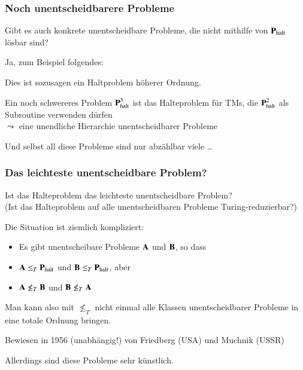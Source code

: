 \documentclass[aspectratio=1610,onlymath]{beamer}
\begin{document}
\begin{frame}\frametitle{Noch unentscheidbarere Probleme}

Gibt es auch konkrete unentscheidbare Probleme, die nicht
mithilfe von $\textbf{\textcolor{black}{P}}_{\text{halt}}$ lösbar sind?
\bigskip\pause

Ja, zum Beispiel folgendes:


Dies ist sozusagen ein Haltproblem höherer Ordnung.\bigskip\pause

Ein noch schwereres Problem $\textbf{\textcolor{black}{P}}^3_{\text{halt}}$ ist
das Halteproblem für TMs, die $\textbf{\textcolor{black}{P}}^2_{\text{halt}}$ als Subroutine
verwenden dürfen\\
$\leadsto$ \alert{eine unendliche Hierarchie unentscheidbarer Probleme}
\bigskip\pause

Und selbst all diese Probleme sind nur abzählbar viele \ldots

\end{frame}

\begin{frame}\frametitle{Das leichteste unentscheidbare Problem?}

\begin{center}
\alert{Ist das Halteproblem das leichteste unentscheidbare Problem?}\\
{\tiny (Ist das Halteproblem auf alle unentscheidbaren Probleme Turing-reduzierbar?)}
\end{center}

\bigskip
\pause {}
\bigskip

Die Situation ist ziemlich kompliziert:
\begin{itemize}
\item Es gibt unentscheibare Probleme $\textbf{\textcolor{black}{A}}$ und $\textbf{\textcolor{black}{B}}$, so dass
\item $\textbf{\textcolor{black}{A}}\leq_T \textbf{\textcolor{black}{P}}_{\text{halt}}$ und $\textbf{\textcolor{black}{B}}\leq_T \textbf{\textcolor{black}{P}}_{\text{halt}}$, aber
\item $\textbf{\textcolor{black}{A}}\not\leq_T \textbf{\textcolor{black}{B}}$ und $\textbf{\textcolor{black}{B}}\not\leq_T \textbf{\textcolor{black}{A}}$
\end{itemize}

Man kann also mit $\not\leq_T$ nicht einmal alle Klassen unentscheidbarer Probleme
in eine totale Ordnung bringen.

{\tiny Bewiesen in 1956 (unabhängig!) von Friedberg (USA) und Muchnik (USSR)}
\bigskip

Allerdings sind diese Probleme sehr künstlich.

\end{frame}
\end{document}

